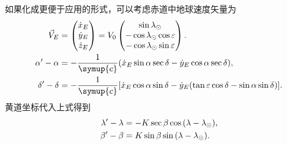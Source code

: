 \documentclass[UTF8, 12pt, a4paper, oneside, onecolumn, fontset=none]{ctexart}
\begin{document}
如果化成更便于应用的形式，可以考虑赤道中地球速度矢量为
\begin{align}
\vec{V}_{E}&=\begin{pmatrix}
\dot{x}_{E}\\
\dot{y}_{E}\\
\dot{z}_{E}
\end{pmatrix}=V_{0}\begin{pmatrix}
\sin{\lambda_{\odot}}\\
-\cos{\lambda_{\odot}}\cos{\varepsilon}\\
-\cos{\lambda_{\odot}}\sin{\varepsilon}
\end{pmatrix}.\\
\alpha'-\alpha&=-\frac{1}{\symup{c}}\mleft(\dot{x}_{E}\sin{\alpha}\sec{\delta}-\dot{y}_{E}\cos{\alpha}\sec{\delta}\mright),\\
\delta'-\delta&=-\frac{1}{\symup{c}}\mleft[\dot{x}_{E}\cos{\alpha}\sin{\delta}-\dot{y}_{E}\mleft(\tan{\varepsilon}\cos{\delta}-\sin{\alpha}\sin{\delta}\mright)\mright].
\end{align}
黄道坐标代入上式得到
\begin{align}
\lambda'-\lambda&=-K\sec{\beta}\cos{\mleft(\lambda-\lambda_{\odot}\mright)},\\
\beta'-\beta&=K\sin{\beta}\sin{\mleft(\lambda-\lambda_{\odot}\mright)}.
\end{align}
\end{document}
